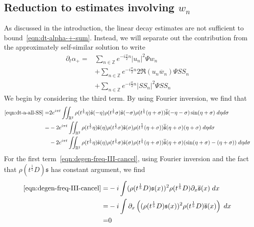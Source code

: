 \documentclass[letterpaper, reqno,final]{amsart}
\newcommand{\bbZ}{\mathbb{Z}}
\newcommand{\bbR}{\mathbb{R}}
\newcommand{\bbT}{\mathbb{T}}
\newcommand{\fs}{\mathfrak{s}}
\newcommand{\fhPi}{\frac{\pi}{2}}
\newcommand{\SSCutoff}[1][\xi]{\rho(t^\frac{1}{5} #1)}
\newcommand{\mSS}{\mathit{SS}}
\begin{document}
\subsection{Reduction to estimates involving \texorpdfstring{$w_n$}{w\_n}}
As discussed in the introduction, the linear decay estimates are not sufficient to bound~\eqref{eqn:dt-alpha-+-sum}.  Instead, we will separate out the contribution from the approximately self-similar solution to write
\begin{subequations}\begin{align}
    \partial_t \alpha_+ =& \sum_{n \in \bbZ} e^{-i\frac{\pi}{2}n} |u_n|^2 \Psi w_{n}\label{eqn:dt-a-Psi-w}\\
    &+ \sum_{n \in \bbZ} e^{-i\frac{\pi}{2}n} 2\Re(u_n \overline{w}_n)\Psi \mSS_{n}\label{eqn:dt-a-Psi-SS}\\
    &+ \sum_{n \in \bbZ}e^{-i\frac{\pi}{2}n} |\mSS_n|^2\Psi \mSS_{n} \label{eqn:dt-a-all-SS}
\end{align}\end{subequations}
We begin by considering the third term.  By using Fourier inversion, we find that
\begin{subequations}\begin{align}
    \eqref{eqn:dt-a-all-SS} %
    =& 2 e^{i\pi t}\iint_{\bbR^2} \SSCutoff[\eta]\hat{\fs}(-\eta) \SSCutoff[\sigma]\hat{\fs}(-\sigma) \SSCutoff[(\eta + \sigma)]\overline{\hat{\fs}}(-\eta-\sigma) \sin(\eta + \sigma) \;d\eta d\sigma\nonumber\\
    =& -2e^{i\pi t} \iint_{\bbR^2} \SSCutoff[\eta]\hat{\fs}(\eta) \SSCutoff[\sigma]\hat{\fs}(\sigma) \SSCutoff[(\eta + \sigma)]\overline{\hat{\fs}}(\eta+\sigma) (\eta + \sigma) \;d\eta d\sigma \label{eqn:degen-freq-III-cancel}\\
    &-2e^{i\pi t} \iint_{\bbR^2} \SSCutoff[\eta]\hat{\fs}(\eta) \SSCutoff[\sigma]\hat{\fs}(\sigma) \SSCutoff[(\eta+\sigma)]\overline{\hat{\fs}}(\eta+\sigma) (\sin(\eta + \sigma) - (\eta + \sigma)) \;d\eta d\sigma \label{eqn:degen-freq-III-small}
\end{align}\end{subequations}
For the first term~\eqref{eqn:degen-freq-III-cancel}, using Fourier inversion and the fact that $\SSCutoff[D]\fs$ has constant argument, we find
\begin{equation*}\begin{split}
    \eqref{eqn:degen-freq-III-cancel}  =& -i\int (\SSCutoff[D] \fs(x))^2 \SSCutoff[D] \partial_x \overline{\fs}(x)\;dx\\
    =& -i\int \partial_x\left((\SSCutoff[D] \fs(x))^2 \SSCutoff[D] \overline{\fs}(x)\right)\;dx\\
    =& 0
\end{split}\end{equation*}
\end{document}
